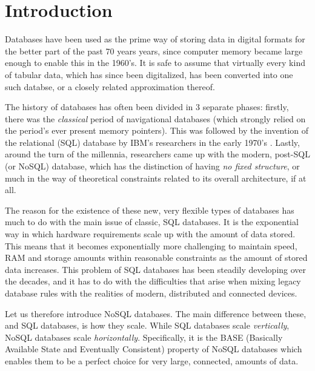 \documentclass[10pt,        %
               a4paper,     %
               journal,     %
               ]{IEEEtran}
\begin{document}


\section{Introduction}
Databases have been used as the prime way of storing data in digital formats for the better part of the past 70 years years, since computer memory became large enough to enable this in the 1960's. It is safe to assume that virtually every kind of tabular data, which has since been digitalized, has been converted into one such databse, or a closely related approximation thereof. \cite{bachman_1973} \par
The history of databases has often been divided in 3 separate phases: firstly, there was the \textit{classical} period of navigational databases (which strongly relied on the period's ever present memory pointers). This was followed by the invention of the relational (SQL) database by IBM's researchers in the early 1970's \cite{codd_1970}. Lastly, around the turn of the millennia, researchers came up with the modern, post-SQL (or NoSQL) database, which has the distinction of having \textit{no fixed structure}, or much in the way of theoretical constraints related to its overall architecture, if at all. \par
The reason for the existence of these new, very flexible types of databases has much to do with the main issue of classic, SQL databases. It is the exponential way in which hardware requirements scale up with the amount of data stored. This means that it becomes exponentially more challenging to maintain speed, RAM and storage amounts within reasonable constraints as the amount of stored data increases. This problem of SQL databases has been steadily developing over the decades, and it has to do with the difficulties that arise when mixing legacy database rules with the realities of modern, distributed and connected devices. \cite{IEEEpaper1:comparison} \par
Let us therefore introduce NoSQL databases. The main difference between these, and SQL databases, is how they scale. While SQL databases scale \textit{vertically}, NoSQL databases scale \textit{horizontally}. Specifically, it is the BASE (Basically Available State and Eventually Consistent) property of NoSQL databases which enables them to be a perfect choice for very large, connected, amounts of data. \par
\end{document}
